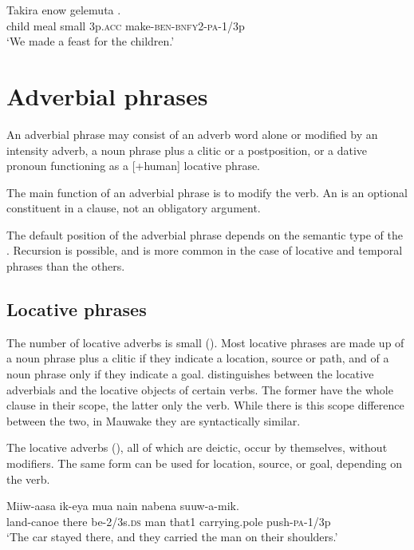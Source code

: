 \ea%
\label{ex:4:x851}
\gll Takira  enow  gelemuta   . \\
   child  meal  small  3p.\textsc{acc}  make-\textsc{ben}-\textsc{bnfy}2-\textsc{pa}-1/3p   \\
\glt`We made a feast for the children.'
\z

\section{Adverbial phrases}
{}
An adverbial phrase may consist of an adverb word alone or modified by an intensity adverb, a noun phrase plus a clitic or a postposition, or a dative pronoun functioning as a [+human] locative phrase.

The main function of an adverbial phrase is to modify the verb. An  is an optional constituent in a clause, not an obligatory argument. 

The default position of the adverbial phrase depends on the semantic type of the . Recursion is possible, and is more common in the case of locative and temporal phrases than the others.

\subsection{Locative phrases} \label{sec:4.6.1}
{}
The number of locative adverbs is small (). Most locative phrases are made up of a noun phrase plus a clitic if they indicate a location, source or path, and of a noun phrase only if they indicate a goal. \citet[78, 110--112]{Givon1984} distinguishes between the locative adverbials and the locative objects of certain verbs. The former have the whole clause in their scope, the latter only the verb. While there is this scope difference between the two, in Mauwake they are syntactically similar. 

The locative adverbs (), all of which are deictic, occur by themselves, without modifiers. The same form can be used for location, source, or goal, depending on the verb.

\ea%
\label{ex:4:x870}
\gll Miiw-aasa    ik-eya  mua  nain  nabena  suuw-a-mik. \\
   land-canoe  there  be-2/3s.\textsc{ds}  man  that1  carrying.pole  push-\textsc{pa}-1/3p   \\
\glt`The car stayed there, and they carried the man on their shoulders.'
\z

